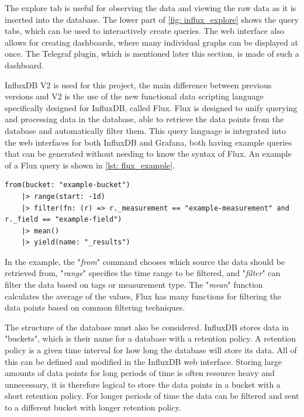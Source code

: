 \documentclass[main.tex]{subfiles}
\begin{document}
The explore tab is useful for observing the data and viewing the raw data as it is inserted into the database. The lower part of \autoref{fig: influx_explore} shows the query tabs, which can be used to interactively create queries. The web interface also allows for creating dashboards, where many individual graphs can be displayed at once. The Telegraf plugin, which is mentioned later this section, is made of such a dashboard.

InfluxDB V2 is used for this project, the main difference between previous versions and V2 is the use of the new functional data scripting language specifically designed for InfluxDB, called Flux. Flux is designed to unify querying and processing data in the database, able to retrieve the data points from the database and automatically filter them. This query language is integrated into the web interfaces for both InfluxDB and Grafana, both having example queries that can be generated without needing to know the syntax of Flux. An example of a Flux query is shown in \autoref{lst: flux_example}.

 \begin{lstlisting}[caption={Example of a flux query retrieving data and filtering it.},captionpos=b, label=lst: flux_example]
from(bucket: "example-bucket")
    |> range(start: -1d)
    |> filter(fn: (r) => r._measurement == "example-measurement" and r._field == "example-field")
    |> mean()
    |> yield(name: "_results")
    \end{lstlisting}


In the example, the "\textit{from}" command chooses which source the data should be retrieved from, "\textit{range}" specifies the time range to be filtered, and "\textit{filter}" can filter the data based on tags or measurement type. The "\textit{mean}" function calculates the average of the values, Flux has many functions for filtering the data points based on common filtering techniques.


The structure of the database must also be considered. InfluxDB stores data in "buckets", which is their name for a database with a retention policy. A retention policy is a given time interval for how long the database will store its data. All of this can be defined and modified in the InfluxDB web interface. Storing large amounts of data points for long periods of time is often resource heavy and unnecessary, it is therefore logical to store the data points in a bucket with a short retention policy. For longer periods of time the data can be filtered and sent to a different bucket with longer retention policy.
\end{document}
